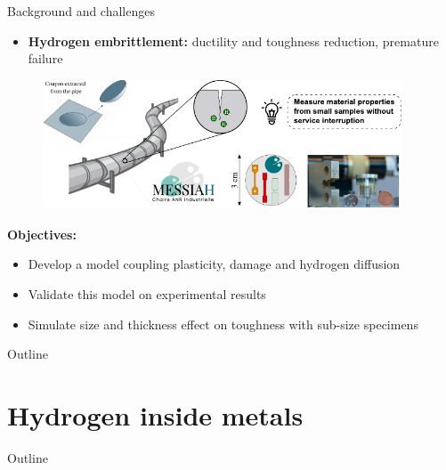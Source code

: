 \documentclass[9pt]{beamer}
\begin{document}
\begin{frame}{Background and challenges}

\begin{itemize}
	\item \textbf{Hydrogen embrittlement:} ductility and toughness reduction, premature failure
\end{itemize}

\begin{figure}
	\centering
	\includegraphics[width=0.95\textwidth]{Images/MESSIAH.pdf}
\end{figure}

\textbf{\textcolor{MINESBlue}{Objectives:}}
\vspace{0.15cm}
\begin{itemize}
	\item Develop a model coupling plasticity, damage and hydrogen diffusion
	\vspace{0.15cm}
	\item Validate this model on experimental results
	\vspace{0.15cm}
	\item Simulate size and thickness effect on toughness with sub-size specimens
\end{itemize}

\end{frame}


\begin{frame}{Outline}
    \tableofcontents
\end{frame}


\section{Hydrogen inside metals}

\begin{frame}{Outline}
	\tableofcontents[ 
    currentsubsection, 
    hideothersubsections, 
    sectionstyle=show/shaded, 
    subsectionstyle=show/shaded, 
    ] 
\end{frame}
\end{document}
